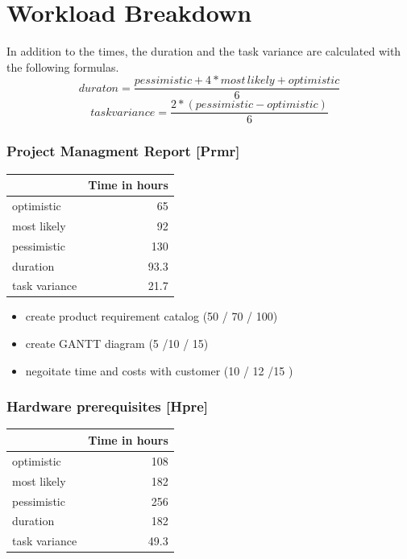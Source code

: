 \chapter{Workload Breakdown}
In addition to the times, the duration and the task variance are calculated with the following formulas. 
\\
\[duraton = \dfrac{pessimistic + 4 * most\, likely + optimistic}{6}\]
\[task variance = \dfrac{2 * (pessimistic - optimistic)}{6}\]
\subsection*{Project Managment Report [Prmr]}
\label{sec:orgd96ec13}
\begin{center}
\begin{tabular}{|l|r|}
	\hline
	 & Time in hours\\
	 \hline
	optimistic & 65\\
	\hline
	most likely & 92\\
	\hline
	pessimistic & 130\\
	\hline
	\hline
	duration & 93.3\\
	\hline
	task variance & 21.7\\
	\hline
\end{tabular}
\end{center}
\begin{itemize}
\item create product requirement catalog (50 / 70 / 100)
\item create GANTT diagram (5 /10 / 15)
\item negoitate time and costs with customer (10 / 12 /15 )
\end{itemize}

\subsection*{Hardware prerequisites [Hpre]}
\label{sec:orgfb33f5b}

\begin{center}
	\begin{tabular}{|l|r|}
		\hline
		& Time in hours\\
		\hline
		optimistic & 108\\
		\hline
		most likely & 182\\
		\hline
		pessimistic & 256\\
		\hline
		\hline
		duration & 182\\
		\hline
		task variance & 49.3\\
		\hline
	\end{tabular}
\end{center}


